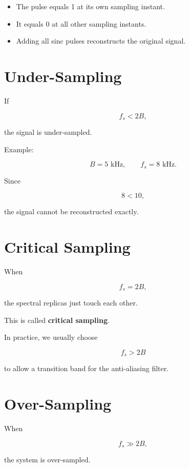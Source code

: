 \begin{itemize}
\item The pulse equals 1 at its own sampling instant.
\item It equals 0 at all other sampling instants.
\item Adding all sinc pulses reconstructs the original signal.
\end{itemize}


\section{Under-Sampling}

If

\[
f_s<2B,
\]

the signal is under-sampled.

Example:

\[
B=5\text{ kHz},
\qquad
f_s=8\text{ kHz}.
\]

Since

\[
8<10,
\]

the signal cannot be reconstructed exactly.


\section{Critical Sampling}

When

\[
f_s=2B,
\]

the spectral replicas just touch each other.

This is called \textbf{critical sampling}.

In practice, we usually choose

\[
f_s>2B
\]

to allow a transition band for the anti-aliasing filter.


\section{Over-Sampling}

When

\[
f_s\gg2B,
\]

the system is over-sampled.


